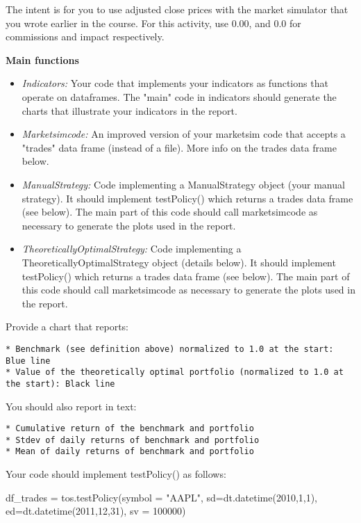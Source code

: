 \documentclass[11pt]{article}
\providecommand{\tightlist}{%
      \setlength{\itemsep}{0pt}\setlength{\parskip}{0pt}}
\begin{document}
The intent is for you to use adjusted close prices with the market
simulator that you wrote earlier in the course. For this activity, use
0.00, and 0.0 for commissions and impact respectively.

\textbf{Main functions}

\begin{itemize}
\tightlist
\item
  \emph{Indicators:} Your code that implements your indicators as
  functions that operate on dataframes. The "main" code in indicators
  should generate the charts that illustrate your indicators in the
  report.
\item
  \emph{Marketsimcode:} An improved version of your marketsim code that
  accepts a "trades" data frame (instead of a file). More info on the
  trades data frame below.
\item
  \emph{ManualStrategy:} Code implementing a ManualStrategy object (your
  manual strategy). It should implement testPolicy() which returns a
  trades data frame (see below). The main part of this code should call
  marketsimcode as necessary to generate the plots used in the report.
\item
  \emph{TheoreticallyOptimalStrategy:} Code implementing a
  TheoreticallyOptimalStrategy object (details below). It should
  implement testPolicy() which returns a trades data frame (see below).
  The main part of this code should call marketsimcode as necessary to
  generate the plots used in the report.
\end{itemize}

Provide a chart that reports:

\begin{verbatim}
* Benchmark (see definition above) normalized to 1.0 at the start: Blue line
* Value of the theoretically optimal portfolio (normalized to 1.0 at the start): Black line
\end{verbatim}

You should also report in text:

\begin{verbatim}
* Cumulative return of the benchmark and portfolio
* Stdev of daily returns of benchmark and portfolio
* Mean of daily returns of benchmark and portfolio
\end{verbatim}

Your code should implement testPolicy() as follows:

df\_trades = tos.testPolicy(symbol = "AAPL", sd=dt.datetime(2010,1,1),
ed=dt.datetime(2011,12,31), sv = 100000)
\end{document}
